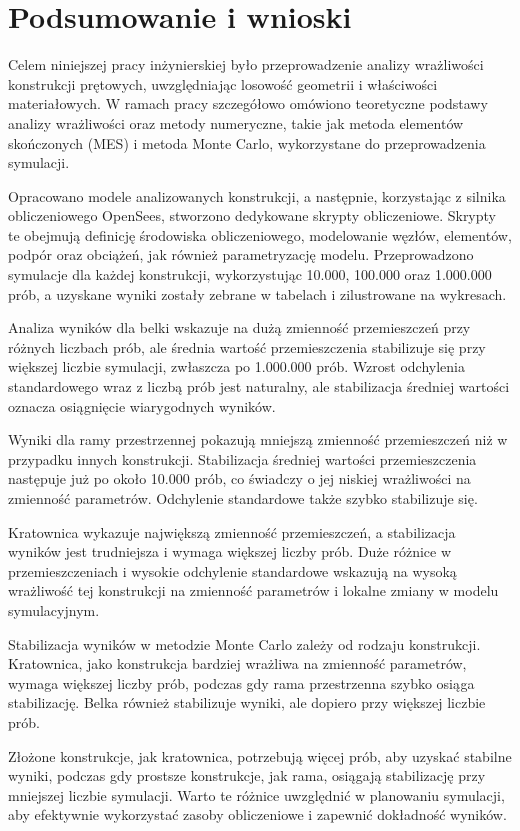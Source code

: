 \section{Podsumowanie i wnioski}

Celem niniejszej pracy inżynierskiej było przeprowadzenie analizy wrażliwości konstrukcji prętowych, uwzględniając losowość geometrii i właściwości materiałowych.
W ramach pracy szczegółowo omówiono teoretyczne podstawy analizy wrażliwości oraz metody numeryczne, takie jak metoda elementów skończonych (MES) i metoda Monte Carlo, wykorzystane do przeprowadzenia symulacji.

Opracowano modele analizowanych konstrukcji, a następnie, korzystając z silnika obliczeniowego OpenSees, stworzono dedykowane skrypty obliczeniowe.
Skrypty te obejmują definicję środowiska obliczeniowego, modelowanie węzłów, elementów, podpór oraz obciążeń, jak również parametryzację modelu.
Przeprowadzono symulacje dla każdej konstrukcji, wykorzystując 10.000, 100.000 oraz 1.000.000 prób, a uzyskane wyniki zostały zebrane w tabelach i zilustrowane na wykresach.

Analiza wyników dla belki wskazuje na dużą zmienność przemieszczeń przy różnych liczbach prób, ale średnia wartość przemieszczenia stabilizuje się przy większej liczbie symulacji, zwłaszcza po 1.000.000 prób.
Wzrost odchylenia standardowego wraz z liczbą prób jest naturalny, ale stabilizacja średniej wartości oznacza osiągnięcie wiarygodnych wyników.

Wyniki dla ramy przestrzennej pokazują mniejszą zmienność przemieszczeń niż w przypadku innych konstrukcji.
Stabilizacja średniej wartości przemieszczenia następuje już po około 10.000 prób, co świadczy o jej niskiej wrażliwości na zmienność parametrów.
Odchylenie standardowe także szybko stabilizuje się.

Kratownica wykazuje największą zmienność przemieszczeń, a stabilizacja wyników jest trudniejsza i wymaga większej liczby prób.
Duże różnice w przemieszczeniach i wysokie odchylenie standardowe wskazują na wysoką wrażliwość tej konstrukcji na zmienność parametrów i lokalne zmiany w modelu symulacyjnym.

Stabilizacja wyników w metodzie Monte Carlo zależy od rodzaju konstrukcji.
Kratownica, jako konstrukcja bardziej wrażliwa na zmienność parametrów, wymaga większej liczby prób, podczas gdy rama przestrzenna szybko osiąga stabilizację.
Belka również stabilizuje wyniki, ale dopiero przy większej liczbie prób.

Złożone konstrukcje, jak kratownica, potrzebują więcej prób, aby uzyskać stabilne wyniki, podczas gdy prostsze konstrukcje, jak rama, osiągają stabilizację przy mniejszej liczbie symulacji.
Warto te różnice uwzględnić w planowaniu symulacji, aby efektywnie wykorzystać zasoby obliczeniowe i zapewnić dokładność wyników.


